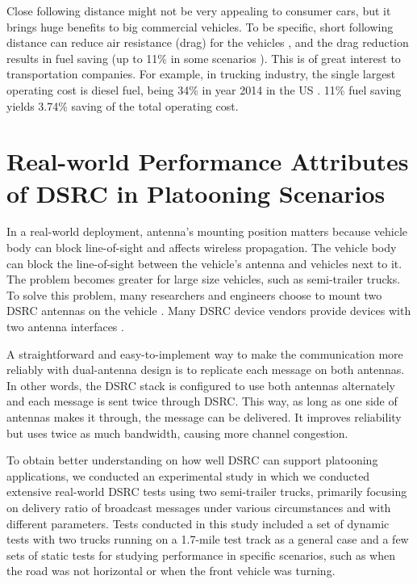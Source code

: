 \documentclass[12pt]{report}
\begin{document}
Close following distance might not be very appealing to consumer cars, but it brings huge benefits to big commercial vehicles. To be specific, short following distance can reduce air resistance (drag) for the vehicles \cite{watts2015computational,fhwa2015report}, and the drag reduction results in fuel saving (up to 11\% in some scenarios \cite{lammert2014effect}). This is of great interest to transportation companies. For example, in trucking industry, the single largest operating cost is diesel fuel, being 34\% in year 2014 in the US \cite{atri2015analysis}. 11\% fuel saving yields 3.74\% saving of the total operating cost.

\section{Real-world Performance Attributes of DSRC in Platooning Scenarios}

\label{sec:background_realworld_performance}

In a real-world deployment, antenna's mounting position matters because vehicle body can block line-of-sight and affects wireless propagation. The vehicle body can block the line-of-sight between the vehicle's antenna and vehicles next to it. The problem becomes greater for large size vehicles, such as semi-trailer trucks. To solve this problem, many researchers and engineers choose to mount two DSRC antennas on the vehicle \cite{Bergenhem20121222,peloton}. Many DSRC device vendors provide devices with two antenna interfaces \cite{aradasystems,denso,unex}.

A straightforward and easy-to-implement way to make the communication more reliably with dual-antenna design is to replicate each message on both antennas. In other words, the DSRC stack is configured to use both antennas alternately and each message is sent twice through DSRC. This way, as long as one side of antennas makes it through, the message can be delivered. It improves reliability but uses twice as much bandwidth, causing more channel congestion.

To obtain better understanding on how well DSRC can support platooning applications, we conducted an experimental study in which we conducted extensive real-world DSRC tests using two semi-trailer trucks\cite{songDSRC2016}, primarily focusing on delivery ratio of broadcast messages under various circumstances and with different parameters. Tests conducted in this study included a set of dynamic tests with two trucks running on a 1.7-mile test track as a general case and a few sets of static tests for studying performance in specific scenarios, such as when the road was not horizontal or when the front vehicle was turning.
\end{document}
